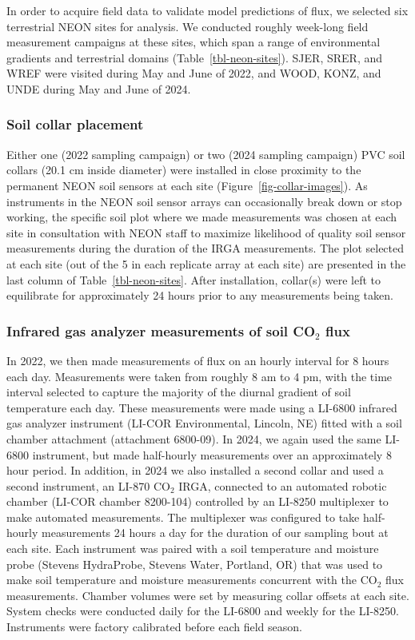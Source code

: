 \documentclass[
  letterpaper,
  DIV=11,
  numbers=noendperiod]{scrartcl}
\begin{document}
In order to acquire field data to validate model predictions of flux, we
selected six terrestrial NEON sites for analysis. We conducted roughly
week-long field measurement campaigns at these sites, which span a range
of environmental gradients and terrestrial domains
(Table~\ref{tbl-neon-sites}). SJER, SRER, and WREF were visited during
May and June of 2022, and WOOD, KONZ, and UNDE during May and June of
2024.

\subsubsection{Soil collar placement}\label{soil-collar-placement}

Either one (2022 sampling campaign) or two (2024 sampling campaign) PVC
soil collars (20.1 cm inside diameter) were installed in close proximity
to the permanent NEON soil sensors at each site
(Figure~\ref{fig-collar-images}). As instruments in the NEON soil sensor
arrays can occasionally break down or stop working, the specific soil
plot where we made measurements was chosen at each site in consultation
with NEON staff to maximize likelihood of quality soil sensor
measurements during the duration of the IRGA measurements. The plot
selected at each site (out of the 5 in each replicate array at each
site) are presented in the last column of Table~\ref{tbl-neon-sites}.
After installation, collar(s) were left to equilibrate for approximately
24 hours prior to any measurements being taken.

\subsubsection{\texorpdfstring{Infrared gas analyzer measurements of
soil CO\(_{2}\)
flux}{Infrared gas analyzer measurements of soil CO\_\{2\} flux}}\label{infrared-gas-analyzer-measurements-of-soil-co_2-flux}

In 2022, we then made measurements of flux on an hourly interval for 8
hours each day. Measurements were taken from roughly 8 am to 4 pm, with
the time interval selected to capture the majority of the diurnal
gradient of soil temperature each day. These measurements were made
using a LI-6800 infrared gas analyzer instrument (LI-COR Environmental,
Lincoln, NE) fitted with a soil chamber attachment (attachment 6800-09).
In 2024, we again used the same LI-6800 instrument, but made half-hourly
measurements over an approximately 8 hour period. In addition, in 2024
we also installed a second collar and used a second instrument, an
LI-870 CO\(_{2}\) IRGA, connected to an automated robotic chamber
(LI-COR chamber 8200-104) controlled by an LI-8250 multiplexer to make
automated measurements. The multiplexer was configured to take
half-hourly measurements 24 hours a day for the duration of our sampling
bout at each site. Each instrument was paired with a soil temperature
and moisture probe (Stevens HydraProbe, Stevens Water, Portland, OR)
that was used to make soil temperature and moisture measurements
concurrent with the CO\(_{2}\) flux measurements. Chamber volumes were
set by measuring collar offsets at each site. System checks were
conducted daily for the LI-6800 and weekly for the LI-8250. Instruments
were factory calibrated before each field season.
\end{document}
